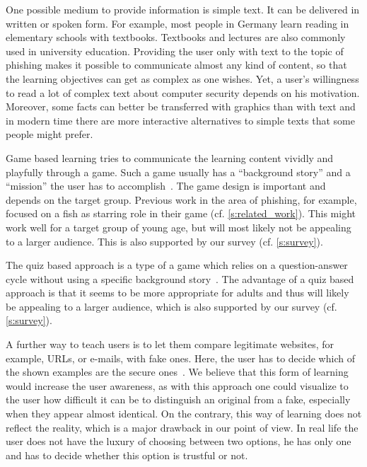 \begin{description}[leftmargin=0cm]
    \item[Simple Text:] One possible medium to provide information is simple text. It can be delivered in written or spoken form. For example, most people in Germany learn reading in elementary schools with textbooks. 
Textbooks and lectures are also commonly used in university education.
 Providing the user only with text to the topic of phishing makes it possible to communicate almost any kind of content, so that the learning objectives can get as complex as one wishes.
Yet, a user's willingness to read a lot of complex text about computer security depends on his motivation. 
 Moreover, some facts can better be transferred with graphics than with text and in modern time there are more interactive alternatives to simple texts that some people might prefer.
    
	\item[Game Based Learning:] Game based learning tries to communicate the learning content vividly and playfully through a game.
 Such a game usually has a ``background story'' and a ``mission'' the user has to accomplish~\cite{sheng2007antiphishingphil,antiphishingphyllis}. The game design is important and depends on the target group.
 Previous work in the area of phishing, for example, focused on a fish as starring role in their game (cf. \autoref{s:related_work}). This might work well for a target group of young age, but will most likely not be appealing to a larger audience.
 This is also supported by our survey (cf. \autoref{s:survey}).
	\item[Quiz Based Learning:] The quiz based approach is a type of a game which relies on a question-answer cycle without using a specific background story~\cite{onguardonline}. The advantage of a quiz based approach is that it seems to be more appropriate for adults and thus will likely be appealing to a larger audience, which is also supported by our survey (cf. \autoref{s:survey}).

	\item[Comparison Based Learning:] A further way to teach users is to let them compare legitimate websites, for example, URLs, or e-mails, with fake ones.
 Here, the user has to decide which of the shown examples are the secure ones~\cite{staysafeonline}. 
We believe that this form of learning would increase the user awareness, as with this approach one could visualize to the user how difficult it can be to distinguish an original from a fake, especially when they appear almost identical.
 On the contrary, this way of learning does not reflect the reality, which is a major drawback in our point of view.
 In real life the user does not have the luxury of choosing between two options, he has only one and has to decide whether this option is trustful or not.


\end{description}
